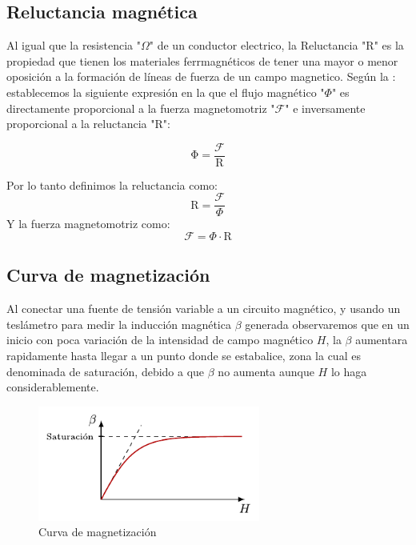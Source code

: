 \documentclass{report}
\begin{document}
  \subsection{Reluctancia magnética}\label{ssec:reluctancia}
Al igual que la resistencia "$\Omega$" de un conductor electrico, la Reluctancia "$\mathrm{R}$" es la propiedad que tienen los materiales
ferrmagnéticos de tener una mayor o menor oposición a la formación de líneas de fuerza de un campo magnetico.
\newline\vspace{1em}
Según la : establecemos la siguiente expresión en la que el flujo magnético "$\Phi$" es directamente proporcional
a la fuerza magnetomotriz "$\mathcal{F}$" e inversamente proporcional a la reluctancia "$\mathrm{R}$":
\begin{figure}[h]
  \[
    \mathrm{\Phi} = \frac{\mathcal{F}}{\mathrm{R}}
  \]
\label{equ:reluctancia}
\end{figure}
\newline Por lo tanto definimos la reluctancia como:
\[
\mathrm{R} = \frac{\mathcal{F}}{\Phi}
\]
\newline Y la fuerza magnetomotriz como:
\[
\mathcal{F} = \Phi \cdot \mathrm{R}
\]

  \subsection{Curva de magnetización}\label{ssec:curva_magnetizada}
Al conectar una fuente de tensión variable a un circuito magnético, y usando un teslámetro para medir la inducción magnética $\beta$ generada
observaremos que en un inicio con poca variación de la intensidad de campo magnético $H$, la $\beta$ aumentara rapidamente
hasta llegar a un punto donde se estabalice, zona la cual es denominada de saturación, debido a que $\beta$ no aumenta aunque $H$ lo haga considerablemente.
\begin{figure}[ht]
  \centering
  \includegraphics[width=0.65\textwidth]{figures/curva_magnetizacion.pdf}
  \caption{Curva de magnetización}
  \label{fig:curva_magnetizacion}
\end{figure}
\end{document}
